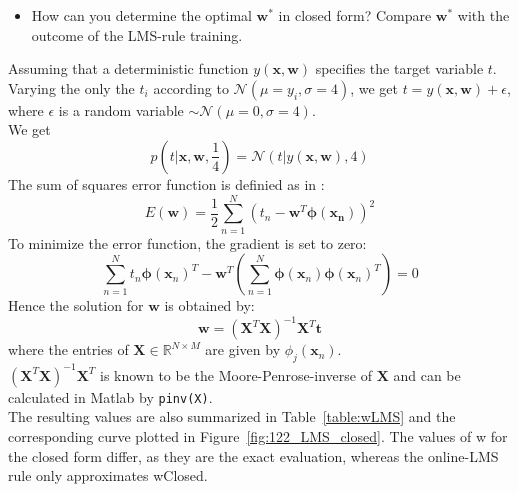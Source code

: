 \documentclass[a4]{article}
\begin{document}
\begin{itemize}
	\item How can you determine the optimal ${\mathbf w}^*$ in closed form? Compare ${\mathbf w}^*$ with the outcome of the LMS-rule training.
\end{itemize}
Assuming that a deterministic function $y(\mathbf{x}, \mathbf{w})$ specifies the target variable $t$. Varying the only the $t_i$ according to $\mathcal{N}(\mu = y_i,\sigma = 4)$, we get $t=y(\mathbf{x}, \mathbf{w}) + \epsilon$, where $\epsilon$ is a random variable $\sim \mathcal{N}(\mu = 0,\sigma = 4)$.\\
We get
$$p(t| \mathbf{x}, \mathbf{w}, \frac{1}{4}) = \mathcal{N}(t|y(\mathbf{x}, \mathbf{w}), 4)$$
The sum of squares error function is definied as in \cite{Bishop}:
$$E(\mathbf{w})=\frac{1}{2} \sum_{n=1} ^N (t_n- \mathbf{w}^T \mathbf{\phi}(\mathbf{x_n}))^2$$
To minimize the error function, the gradient is set to zero:
$$\sum_{n=1}^N t_n \mathbf{\phi}(\mathbf{x}_n)^T- \mathbf{w}^T \left( \sum_{n=1} ^N \mathbf{\phi} ( \mathbf{x}_n) \mathbf{\phi} ( \mathbf{x}_n)^T \right)=0$$
Hence the solution for $\mathbf{w}$ is obtained by:
$$ \mathbf{w}=(\mathbf{X}^T\mathbf{X})^{-1}\mathbf{X}^T\mathbf{t}$$
where the entries of $\mathbf{X} \in \mathbb{R}^{N \times M}$ are given by $\phi_j(\mathbf{x}_n)$. \\
$(\mathbf{X}^T\mathbf{X})^{-1}\mathbf{X}^T$ is known to be the Moore-Penrose-inverse of $\mathbf{X}$ and can be calculated in Matlab by \verb+pinv(X)+. \\

The resulting values are also summarized in Table~\ref{table:wLMS} and the corresponding curve plotted in Figure~\ref{fig:122_LMS_closed}. The values of w for the closed form differ, as they are the exact evaluation, whereas the online-LMS rule only approximates wClosed.
\end{document}
